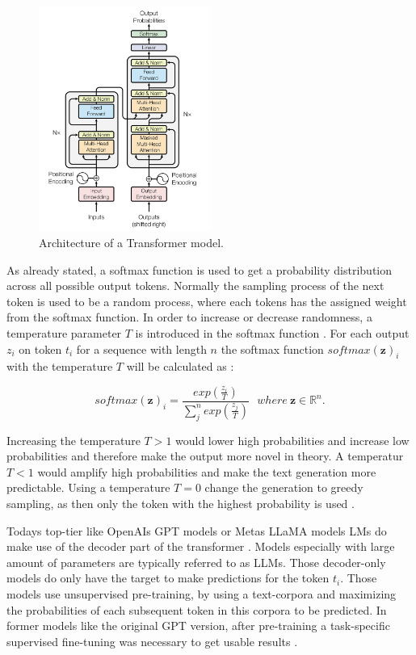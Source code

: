 \documentclass[a4paper,oneside,bibliography=totoc]{scrbook}
\begin{document}
\begin{figure}[t]
  \centering
  \includegraphics[width=0.5\textwidth]{figures/Transformer.png}
  \caption{Architecture of a Transformer model. \cite{Vaswani2023}}
  \label{fig:transformer}
\end{figure}

As already stated, a softmax function is used to get a probability distribution across all possible output tokens. Normally the sampling process of the next token is used to be a random process, where each tokens has the assigned weight from the softmax function. In order to increase or decrease randomness, a temperature parameter $T$ is introduced in the softmax function \cite{Peeperkorn2024}. For each output $z_i$ on token $t_i$ for a sequence with length $n$ the softmax function $softmax(\mathbf{z})_i$ with the temperature $T$ will be calculated as \cite{Peeperkorn2024}:

\begin{equation}
  softmax(\mathbf{z})_i = \frac{exp(\frac{z_i}{T})}{\sum^n_j exp(\frac{z_j}{T})}~~~where~\mathbf{z} \in \mathbb{R}^n.
\end{equation}

Increasing the temperature $T>1$ would lower high probabilities and increase low probabilities and therefore make the output more novel in theory. A temperatur $T<1$ would amplify high probabilities and make the text generation more predictable. Using a temperature $T=0$ change the generation to greedy sampling, as then only the token with the highest probability is used \cite{Peeperkorn2024}.

Todays top-tier like OpenAIs \ac{GPT} models or Metas \ac{LLaMA} models \acp{LM} do make use of the decoder part of the transformer \cite{Radford2018,Grattafiori2024}. Models especially with large amount of parameters are typically referred to as \acp{LLM}. Those decoder-only models do only have the target to make predictions for the token $t_i$. Those models use unsupervised pre-training, by using a text-corpora and maximizing the probabilities of each subsequent token in this corpora to be predicted. In former models like the original GPT version, after pre-training a task-specific supervised fine-tuning was necessary to get usable results \cite{Radford2018}.
\end{document}
